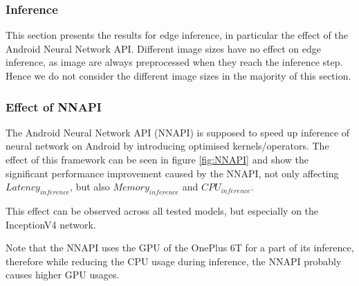 \subsubsection{Inference}
This section presents the results for edge inference, in particular the effect of the Android Neural Network API.
Different image sizes have no effect on edge inference, as image are always preprocessed when they reach the inference step.
Hence we do not consider the different image sizes in the majority of this section.

\subsubsection{Effect of NNAPI}
The Android Neural Network API (NNAPI) is supposed to speed up inference of neural network on Android by introducing optimised kernels/operators. 
The effect of this framework can be seen in figure \ref{fig:NNAPI} and show the significant performance improvement caused by the NNAPI, not only affecting $Latency_{inference}$, but also $Memory_{inference}$ and $CPU_{inference}$.

This effect can be observed across all tested models, but especially on the InceptionV4 network.

Note that the NNAPI uses the GPU of the OnePlus 6T for a part of its inference, therefore while reducing the CPU usage during inference, the NNAPI probably causes higher GPU usages.

